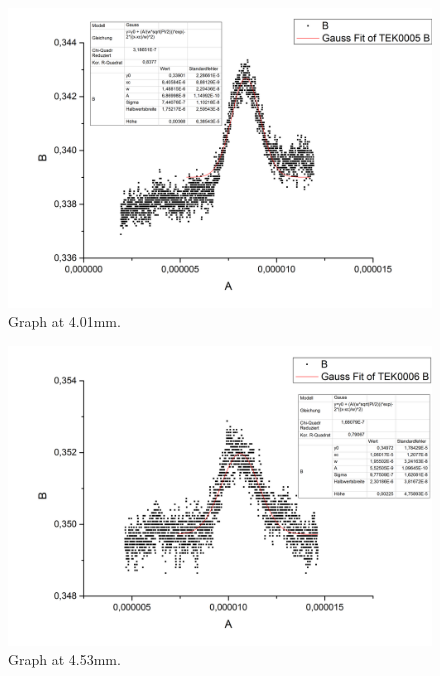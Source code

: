 \begin{figure}[h]
\begin{center}
\includegraphics[scale=0.25]{Bilder/Teil2/Graph5}
\caption{Graph at 4.01mm.}
\label{fig:graph5}
\end{center}
\end{figure}
\begin{figure}[h]
\begin{center}
\includegraphics[scale=0.25]{Bilder/Teil2/Graph6}
\caption{Graph at 4.53mm.}
\label{fig:graph6}
\end{center}
\end{figure}
